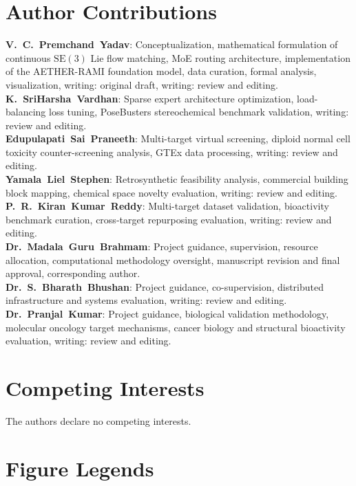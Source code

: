 \documentclass[11pt,a4paper]{article}
\begin{document}
\section*{Author Contributions}
\textbf{V.~C.~Premchand~Yadav}: Conceptualization, mathematical formulation of continuous $\mathrm{SE}(3)$ Lie flow matching, MoE routing architecture, implementation of the AETHER-RAMI foundation model, data curation, formal analysis, visualization, writing: original draft, writing: review and editing. \\
\textbf{K.~SriHarsha~Vardhan}: Sparse expert architecture optimization, load-balancing loss tuning, PoseBusters stereochemical benchmark validation, writing: review and editing. \\
\textbf{Edupulapati~Sai~Praneeth}: Multi-target virtual screening, diploid normal cell toxicity counter-screening analysis, GTEx data processing, writing: review and editing. \\
\textbf{Yamala~Liel~Stephen}: Retrosynthetic feasibility analysis, commercial building block mapping, chemical space novelty evaluation, writing: review and editing. \\
\textbf{P.~R.~Kiran~Kumar~Reddy}: Multi-target dataset validation, bioactivity benchmark curation, cross-target repurposing evaluation, writing: review and editing. \\
\textbf{Dr.~Madala~Guru~Brahmam}: Project guidance, supervision, resource allocation, computational methodology oversight, manuscript revision and final approval, corresponding author. \\
\textbf{Dr.~S.~Bharath~Bhushan}: Project guidance, co-supervision, distributed infrastructure and systems evaluation, writing: review and editing. \\
\textbf{Dr.~Pranjal~Kumar}: Project guidance, biological validation methodology, molecular oncology target mechanisms, cancer biology and structural bioactivity evaluation, writing: review and editing.

\section*{Competing Interests}
The authors declare no competing interests.

\newpage

\newpage


\clearpage
\section*{Figure Legends}
\end{document}
